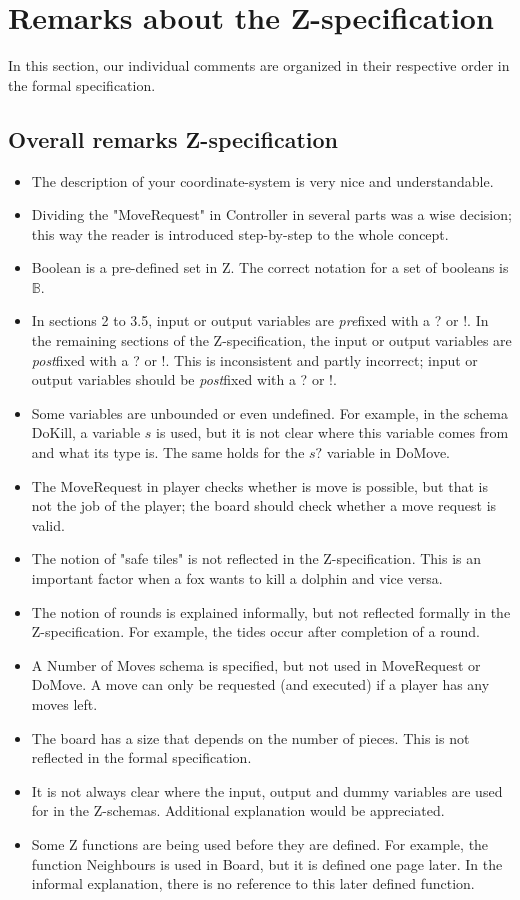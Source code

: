 \documentclass[a4paper,11pt]{article}
\begin{document}
	\section{Remarks about the Z-specification}
    In this section, our individual comments are organized in their respective order in the formal specification.
    \subsection{Overall remarks Z-specification}
    \begin{itemize}
        \item The description of your coordinate-system is very nice and understandable.
        \item Dividing the "MoveRequest" in Controller in several parts was a wise decision; this way the reader is introduced step-by-step to the whole concept.
        \item Boolean is a pre-defined set in Z. The correct notation for a set of booleans is $\mathds{B}$.
        \item In sections 2 to  3.5, input or output variables are \emph{pre}fixed with a ? or !. In the remaining sections of the Z-specification, the input or output variables are \emph{post}fixed with a ? or !. This is inconsistent and partly incorrect; input or output variables should be \emph{post}fixed with a ? or !.
        \item Some variables are unbounded or even undefined. For example, in the schema DoKill, a variable $s$ is used, but it is not clear where this variable comes from and what its type is. The same holds for the $s?$ variable in DoMove.
        \item The MoveRequest in player checks whether is move is possible, but that is not the job of the player; the board should check whether a move request is valid.
        \item The notion of "safe tiles" is not reflected in the Z-specification. This is an important factor when a fox wants to kill a dolphin and vice versa.
        \item The notion of rounds is explained informally, but not reflected formally in the Z-specification. For example, the tides occur after completion of a round.
        \item A Number of Moves schema is specified, but not used in MoveRequest or DoMove. A move can only be requested (and executed) if a player has any moves left.
        \item The board has a size that depends on the number of pieces. This is not reflected in the formal specification.
        \item It is not always clear where the input, output and dummy variables are used for in the Z-schemas. Additional explanation would be appreciated.
	   \item Some Z functions are being used before they are defined. For example, the function Neighbours is used in Board, but it is defined one page later. In the informal explanation, there is no reference to this later defined function.
   \end{itemize}
\end{document}
